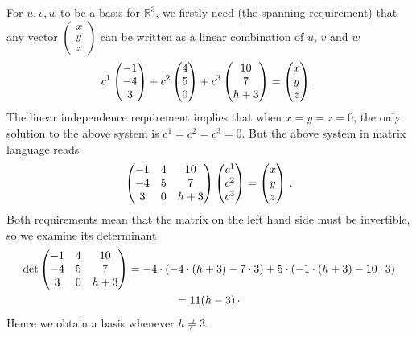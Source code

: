 \begin{enumerate}
For $u,v,w$ to be a basis for ${\mathbb R}^3$, we firstly need  (the spanning requirement) that any vector $\begin{pmatrix}x \\ y \\ z\end{pmatrix}$ can be written
as a linear combination of $u$, $v$ and $w$
\[
c^1 \begin{pmatrix}-1 \\ -4 \\ 3\end{pmatrix} + c^2 \begin{pmatrix}4 \\ 5 \\ 0\end{pmatrix} + c^3 \begin{pmatrix}\mc{10} \\ \mc{7} \\ h+3\end{pmatrix} = \begin{pmatrix}x \\ y \\ z\end{pmatrix}\, .
\]
The linear independence requirement implies that when $x=y=z=0$, the only solution to the above system is $c^1=c^2=c^3=0$.
But the above system in matrix language reads
\[
\begin{pmatrix}
-1 &4 &\mc{10} \\ -4 & 5 &\mc{7} \\ 3 & 0 & h+3
\end{pmatrix}
\begin{pmatrix}c^1 \\ c^2 \\ c^3\end{pmatrix}=\begin{pmatrix}x \\ y \\ z\end{pmatrix}\, .
\]
Both requirements mean that the matrix on the left hand side must be invertible, so we examine its determinant
\begin{gather*}
\det\begin{pmatrix}
-1 &4 &\mc{10} \\ -4 & 5 &\mc{7} \\ 3 & 0 & h+3
\end{pmatrix}
= -4\cdot (-4\cdot(h+3)-7\cdot3)+ 5\cdot(-1\cdot(h+3)-10\cdot3)\\=11(h-3)\, \cdot
\end{gather*}
Hence we obtain a basis whenever $h\neq 3$.

\end{enumerate}

\newpage
